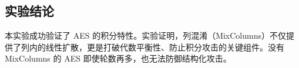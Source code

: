 \subsection{实验结论}
本实验成功验证了 AES 的积分特性。实验证明，列混淆（MixColumns）不仅提供了列内的线性扩散，更是打破代数平衡性、防止积分攻击的关键组件。没有 MixColumns 的 AES 即使轮数再多，也无法防御结构化攻击。